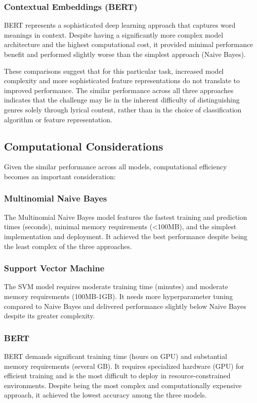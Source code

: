 \documentclass[conference]{IEEEtran}
\begin{document}
\subsubsection{Contextual Embeddings (BERT)}
BERT represents a sophisticated deep learning approach that captures word meanings in context. Despite having a significantly more complex model architecture and the highest computational cost, it provided minimal performance benefit and performed slightly worse than the simplest approach (Naive Bayes).

These comparisons suggest that for this particular task, increased model complexity and more sophisticated feature representations do not translate to improved performance. The similar performance across all three approaches indicates that the challenge may lie in the inherent difficulty of distinguishing genres solely through lyrical content, rather than in the choice of classification algorithm or feature representation.

\subsection{Computational Considerations}
Given the similar performance across all models, computational efficiency becomes an important consideration:

\subsubsection{Multinomial Naive Bayes}
The Multinomial Naive Bayes model features the fastest training and prediction times (seconds), minimal memory requirements (<100MB), and the simplest implementation and deployment. It achieved the best performance despite being the least complex of the three approaches.

\subsubsection{Support Vector Machine}
The SVM model requires moderate training time (minutes) and moderate memory requirements (100MB-1GB). It needs more hyperparameter tuning compared to Naive Bayes and delivered performance slightly below Naive Bayes despite its greater complexity.

\subsubsection{BERT}
BERT demands significant training time (hours on GPU) and substantial memory requirements (several GB). It requires specialized hardware (GPU) for efficient training and is the most difficult to deploy in resource-constrained environments. Despite being the most complex and computationally expensive approach, it achieved the lowest accuracy among the three models.
\end{document}
